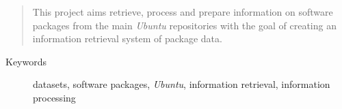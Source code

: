 \begin{abstract}

This project aims retrieve, process and prepare information on software packages from the main \emph{Ubuntu} repositories with the goal of creating an information retrieval system of package data.

\end{abstract}

\begin{description}
    \item[Keywords] datasets, software packages, \emph{Ubuntu}, information retrieval, information processing
\end{description}


